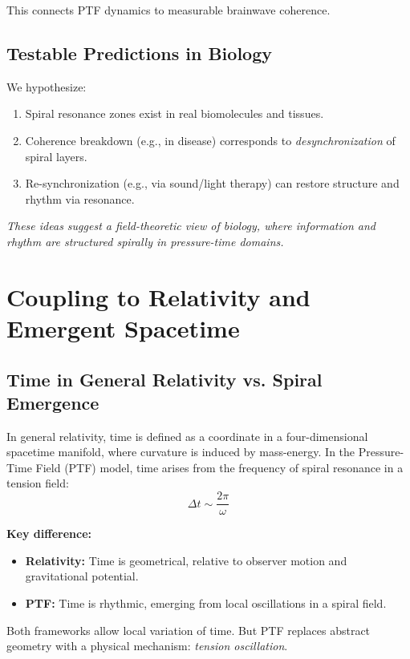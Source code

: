 \documentclass[a4paper,12pt]{article}
\begin{document}
This connects PTF dynamics to measurable brainwave coherence.

\subsection{Testable Predictions in Biology}

We hypothesize:
\begin{enumerate}
    \item Spiral resonance zones exist in real biomolecules and tissues.
    \item Coherence breakdown (e.g., in disease) corresponds to \textit{desynchronization} of spiral layers.
    \item Re-synchronization (e.g., via sound/light therapy) can restore structure and rhythm via resonance.
\end{enumerate}

\noindent
\textit{These ideas suggest a field-theoretic view of biology, where information and rhythm are structured spirally in pressure-time domains.}

\section{Coupling to Relativity and Emergent Spacetime}
\label{sec:relativity}

\subsection{Time in General Relativity vs. Spiral Emergence}

In general relativity, time is defined as a coordinate in a four-dimensional spacetime manifold, where curvature is induced by mass-energy.  
In the Pressure-Time Field (PTF) model, time arises from the frequency of spiral resonance in a tension field:
\[
\Delta t \sim \frac{2\pi}{\omega}
\]

\textbf{Key difference:}
\begin{itemize}
    \item \textbf{Relativity:} Time is geometrical, relative to observer motion and gravitational potential.
    \item \textbf{PTF:} Time is rhythmic, emerging from local oscillations in a spiral field.
\end{itemize}

Both frameworks allow local variation of time.  
But PTF replaces abstract geometry with a physical mechanism: \textit{tension oscillation}.
\end{document}
